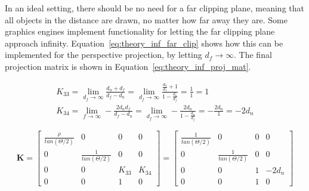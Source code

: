 In an ideal setting, there should be no need for a far clipping plane, meaning that all objects in the distance are drawn, no matter how far away they are. Some graphics engines implement functionality for letting the far clipping plane approach infinity. Equation~\eqref{eq:theory_inf_far_clip} shows how this can be implemented for the perspective projection, by letting $d_f \rightarrow \infty$. The final projection matrix is shown in Equation~\eqref{eq:theory_inf_proj_mat}.

\begin{equation}
    \begin{aligned}
    K_{33} = \lim_{d_f \rightarrow \infty} \frac{d_n+d_f}{d_f-d_n} =
    \lim_{d_f \rightarrow \infty} \frac{\frac{d_n}{d_f}+1}{1-\frac{d_n}{d_f}} = 
    \frac{1}{1} = 1 \\
    K_{34} = \lim_{f \rightarrow \infty} -\frac{2d_n d_f}{d_f-d_n} = 
    \lim_{d_f \rightarrow \infty} -\frac{2d_n}{1-\frac{d_n}{d_f}} =
    -\frac{2d_n}{1} = -2d_n
    \end{aligned}
    \label{eq:theory_inf_far_clip}
\end{equation}

\begin{equation}
    \mathbf{K} = \begin{bmatrix}
        \frac{\rho}{tan(\Theta/2)} & 0 & 0 & 0 \\
        0 & \frac{1}{tan(\Theta/2)} & 0 & 0 \\
        0 & 0 & K_{33} & K_{34} \\
        0 & 0 & 1 & 0 
    \end{bmatrix} = \begin{bmatrix}
        \frac{1}{tan(\Theta/2)} & 0 & 0 & 0 \\
        0 & \frac{1}{tan(\Theta/2)} & 0 & 0 \\
        0 & 0 & 1 & -2d_n \\
        0 & 0 & 1 & 0 
    \end{bmatrix}
    \label{eq:theory_inf_proj_mat}
\end{equation}





